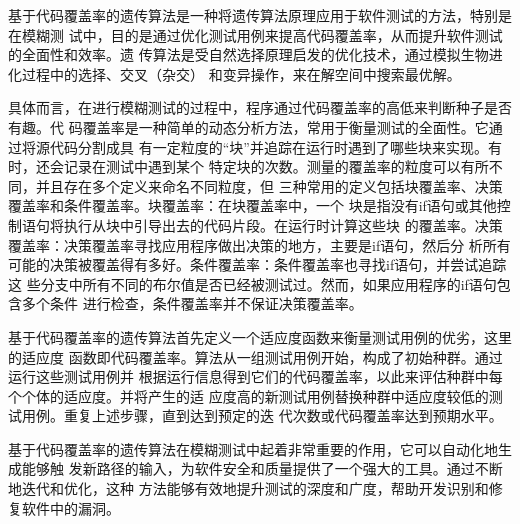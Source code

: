 基于代码覆盖率的遗传算法是一种将遗传算法原理应用于软件测试的方法，特别是在模糊测
试中，目的是通过优化测试用例来提高代码覆盖率，从而提升软件测试的全面性和效率。遗
传算法是受自然选择原理启发的优化技术，通过模拟生物进化过程中的选择、交叉（杂交）
和变异操作，来在解空间中搜索最优解。

具体而言，在进行模糊测试的过程中，程序通过代码覆盖率的高低来判断种子是否有趣。代
码覆盖率是一种简单的动态分析方法，常用于衡量测试的全面性。它通过将源代码分割成具
有一定粒度的“块”并追踪在运行时遇到了哪些块来实现。有时，还会记录在测试中遇到某个
特定块的次数。测量的覆盖率的粒度可以有所不同，并且存在多个定义来命名不同粒度，但
三种常用的定义包括块覆盖率、决策覆盖率和条件覆盖率。块覆盖率：在块覆盖率中，一个
块是指没有if语句或其他控制语句将执行从块中引导出去的代码片段。在运行时计算这些块
的覆盖率。决策覆盖率：决策覆盖率寻找应用程序做出决策的地方，主要是if语句，然后分
析所有可能的决策被覆盖得有多好。条件覆盖率：条件覆盖率也寻找if语句，并尝试追踪这
些分支中所有不同的布尔值是否已经被测试过。然而，如果应用程序的if语句包含多个条件
进行检查，条件覆盖率并不保证决策覆盖率。

基于代码覆盖率的遗传算法首先定义一个适应度函数来衡量测试用例的优劣，这里的适应度
函数即代码覆盖率。算法从一组测试用例开始，构成了初始种群。通过运行这些测试用例并
根据运行信息得到它们的代码覆盖率，以此来评估种群中每个个体的适应度。并将产生的适
应度高的新测试用例替换种群中适应度较低的测试用例。重复上述步骤，直到达到预定的迭
代次数或代码覆盖率达到预期水平。

基于代码覆盖率的遗传算法在模糊测试中起着非常重要的作用，它可以自动化地生成能够触
发新路径的输入，为软件安全和质量提供了一个强大的工具。通过不断地迭代和优化，这种
方法能够有效地提升测试的深度和广度，帮助开发识别和修复软件中的漏洞。

